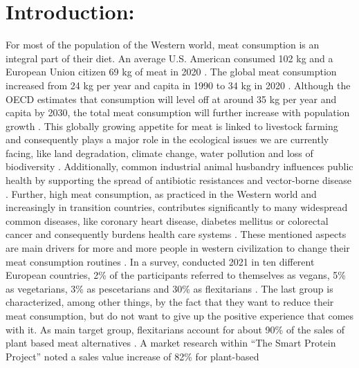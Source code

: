 \documentclass[preprint, 3p,
authoryear]{elsarticle} %
\begin{document}
\hypertarget{introduction}{%
\section{Introduction:}\label{introduction}}

For most of the population of the Western world, meat consumption is an
integral part of their diet. An average U.S. American consumed 102 kg
and a European Union citizen 69 kg of meat in 2020
\citep{EuropeanCommission.2020, OECD.2022}. The global meat consumption
increased from 24 kg per year and capita in 1990 to 34 kg in 2020
\citep{OECDandFoodandAgricultureOrganizationoftheUnitedNations.2022, OECD.2022}.
Although the OECD estimates that consumption will level off at around 35
kg per year and capita by 2030, the total meat consumption will further
increase with population growth
\citep{OECDandFoodandAgricultureOrganizationoftheUnitedNations.2022}.
This globally growing appetite for meat is linked to livestock farming
and consequently plays a major role in the ecological issues we are
currently facing, like land degradation, climate change, water pollution
and loss of biodiversity \citep{Steinfeld.2006, Bianchi.2018}.
Additionally, common industrial animal husbandry influences public
health by supporting the spread of antibiotic resistances and
vector-borne disease \citep{Economou.2015, Bianchi.2018, Watts.2018}.
Further, high meat consumption, as practiced in the Western world and
increasingly in transition countries, contributes significantly to many
widespread common diseases, like coronary heart disease, diabetes
mellitus or colorectal cancer and consequently burdens health care
systems \citep{Micha.2010, Chan.2011, Parkin.2011, Feskens.2013}. These
mentioned aspects are main drivers for more and more people in western
civilization to change their meat consumption routines
\citep{StollKleemann.2017, Ploll.2020}. In a survey, conducted 2021 in
ten different European countries, 2\% of the participants referred to
themselves as vegans, 5\% as vegetarians, 3\% as pescetarians and 30\%
as flexitarians
\citep{EuropeanUnionsHorizon2020reasearchandinnovationprogramme.2021b}.
The last group is characterized, among other things, by the fact that
they want to reduce their meat consumption, but do not want to give up
the positive experience that comes with it. As main target group,
flexitarians account for about 90\% of the sales of plant based meat
alternatives \citep{Neuhofer.2022}. A market research within ``The Smart
Protein Project'' noted a sales value increase of 82\% for plant-based
\end{document}
